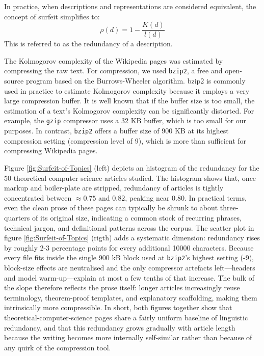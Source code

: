 In practice, when descriptions and representations are considered equivalent, the concept of surfeit simplifies to:
\[
\rho(d) = 1 - \frac{K(d)}{l(d)}
\]
This is referred to as the redundancy of a description.

The Kolmogorov complexity of the Wikipedia pages was estimated by compressing the raw text. For compression, we used \texttt{bzip2}, a free and open-source program based on the Burrows-Wheeler algorithm. bzip2 is commonly used in practice to estimate Kolmogorov complexity because it employs a very large compression buffer. It is well known that if the buffer size is too small, the estimation of a text's Kolmogorov complexity can be significantly distorted. For example, the \texttt{gzip} compressor uses a 32 KB buffer, which is too small for our purposes. In contrast, \texttt{bzip2} offers a buffer size of 900 KB at its highest compression setting (compression level of 9), which is more than sufficient for compressing Wikipedia pages.

Figure \ref{fig:Surfeit-of-Topics} (left) depicts an histogram of the redundancy for the 50 theoretical computer science articles studied. The histogram shows that, once markup and boiler-plate are stripped, redundancy of articles is tightly concentrated between $\approx 0.75$ and $0.82$, peaking near $0.80$. In practical terms, even the clean prose of these pages can typically be shrunk to about three-quarters of its original size, indicating a common stock of recurring phrases, technical jargon, and definitional patterns across the corpus. The scatter plot in figure \ref{fig:Surfeit-of-Topics} (rigth) adds a systematic dimension: redundancy rises by roughly 2-3 percentage points for every additional 10000 characters. Because every file fits inside the single 900 kB block used at \texttt{bzip2}'s highest setting (-9), block-size effects are neutralised and the only compressor artefacts left—headers and model warm-up—explain at most a few tenths of that increase. The bulk of the slope therefore reflects the prose itself: longer articles increasingly reuse terminology, theorem-proof templates, and explanatory scaffolding, making them intrinsically more compressible. In short, both figures together show that theoretical-computer-science pages share a fairly uniform baseline of linguistic redundancy, and that this redundancy grows gradually with article length because the writing becomes more internally self-similar rather than because of any quirk of the compression tool.

